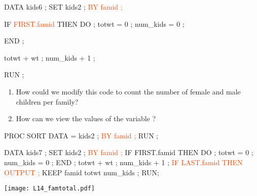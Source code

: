 \begin{frame}[fragile]
\footnotesize
\begin{code}{.0}
DATA kids6 ;
   SET kids2 ;
   \textcolor{OrangeRed}{BY famid ;}

   IF \textcolor{OrangeRed}{FIRST.famid} THEN DO ;
      totwt = 0 ;
      num_kids = 0 ;
      
      
   END ;

   totwt + wt ;
   num_kids + 1 ;
   
   

RUN ;
\end{code}
\emp
{} \hspace{0.05in} \emp
{}
\oyo 
\begin{enumerate}
\item How could we modify this code to count the number of female and male children per family?
\item How can we view the values of the variable ?
\end{enumerate}
\emp
\end{frame}





\begin{frame}[fragile]
\footnotesize
\begin{code}{.0}
PROC SORT DATA = kids2 ;
   \textcolor{OrangeRed}{BY famid ;}
RUN ;

DATA kids7 ;
   SET kids2 ;
   \textcolor{OrangeRed}{BY famid ;}
   IF FIRST.famid THEN DO ;
      totwt = 0 ;
      num_kids = 0 ;
   END ;
   totwt + wt ;
   num_kids + 1 ;
   \textcolor{OrangeRed}{IF LAST.famid THEN OUTPUT ;}
   KEEP famid totwt num_kids ;
RUN;
\end{code}
\emp
{} \hspace{0.05in} \emp
{}
\texttt{[image: L14\_famtotal.pdf]}
\emp
\end{frame}


 